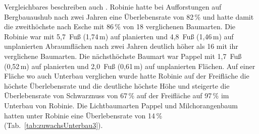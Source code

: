 \documentclass[twocolumn]{scrartcl}
\begin{document}
\begin{table}[htbp]
  \centering
  \caption{Überlebensraten und Höhen von unterbauten Baumarten nach \citet{chapman1951robinieSchirm}}
  \label{tab:zuwachsUnterbau2}
\end{table}

Vergleichbares beschreiben auch
\citet{limstrom1951schuttaufforstung}. Robinie hatte bei Aufforstungen
auf Bergbauaushub nach zwei Jahren eine Überlebensrate von 82\,\% und
hatte damit die zweithöchste nach Esche mit 86\,\% von 18 verglichenen
Baumarten. Die Robinie war mit 5,7~Fuß (1,74\,m) auf planierten und
4,8~Fuß (1,46\,m) auf unplanierten Abraumflächen nach zwei Jahren
deutlich höher als 16 mit ihr verglichene Baumarten. Die nächsthöchste
Baumart war Pappel mit 1,7~Fuß (0,52\,m) auf planierten und 2,0~Fuß
(0,61\,m) auf unplanierten Flächen. Auf einer Fläche wo auch Unterbau
verglichen wurde hatte Robinie auf der Freifläche die höchste
Überlebensrate und die deutliche höchste Höhe und steigerte die
Überlebensrate von Schwarznuss von 67\,\% auf der Freifläche auf
97\,\% im Unterbau von Robinie. Die Lichtbaumarten Pappel und
Milchorangenbaum hatten unter Robinie eine Überlebensrate von 14\,\%
(Tab.~\ref{tab:zuwachsUnterbau3}).
\end{document}
